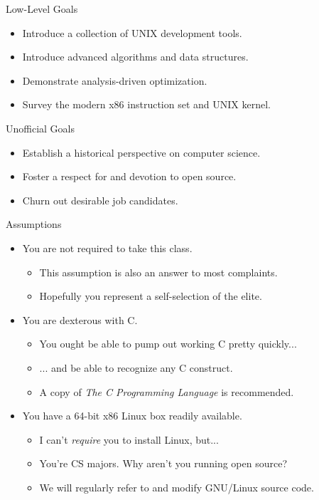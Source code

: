 \documentclass{beamer}
\begin{document}
\begin{frame}{Low-Level Goals}
\begin{itemize}
\item Introduce a collection of UNIX development tools.
\item Introduce advanced algorithms and data structures.
\item Demonstrate analysis-driven optimization.
\item Survey the modern x86 instruction set and UNIX kernel.
\end{itemize}
\end{frame}

\begin{frame}{Unofficial Goals}
\begin{itemize}
\item Establish a historical perspective on computer science.
\item Foster a respect for and devotion to open source.
\item Churn out desirable job candidates.
\end{itemize}
\end{frame}

\begin{frame}{Assumptions}
\begin{itemize}
\item You are not required to take this class.
\begin{itemize}
\item This assumption is also an answer to most complaints.
\item Hopefully you represent a self-selection of the elite.
\end{itemize}
\item You are dexterous with C.
\begin{itemize}
\item You ought be able to pump out working C pretty quickly...
\item ... and be able to recognize any C construct.
\item A copy of {\it The C Programming Language} is recommended.
\end{itemize}
\item You have a 64-bit x86 Linux box readily available.
\begin{itemize}
\item I can't {\it require} you to install Linux, but...
\item You're CS majors. Why aren't you running open source?
\item We will regularly refer to and modify GNU/Linux source code.
\end{itemize}
\end{itemize}
\end{frame}
\end{document}
